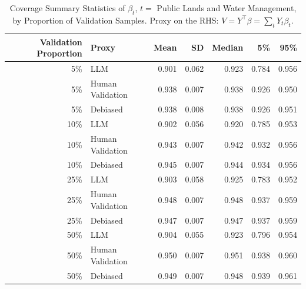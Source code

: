 \begin{table}

\caption{Coverage Summary Statistics of $\beta_{t}$, $t=$ Public Lands and Water Management, by Proportion of Validation Samples.
      Proxy on the RHS: $V = Y^\top \beta = \sum_{t} Y_t \beta_t$.}
\centering
\begin{tabular}[t]{rlrrrrr}
\toprule
Validation Proportion & Proxy & Mean & SD & Median & 5\% & 95\%\\
\midrule
5\% & LLM & 0.901 & 0.062 & 0.923 & 0.784 & 0.956\\
5\% & Human Validation & 0.938 & 0.007 & 0.938 & 0.926 & 0.950\\
5\% & Debiased & 0.938 & 0.008 & 0.938 & 0.926 & 0.951\\
10\% & LLM & 0.902 & 0.056 & 0.920 & 0.785 & 0.953\\
10\% & Human Validation & 0.943 & 0.007 & 0.942 & 0.932 & 0.956\\
10\% & Debiased & 0.945 & 0.007 & 0.944 & 0.934 & 0.956\\
25\% & LLM & 0.903 & 0.058 & 0.925 & 0.783 & 0.952\\
25\% & Human Validation & 0.948 & 0.007 & 0.948 & 0.937 & 0.959\\
25\% & Debiased & 0.947 & 0.007 & 0.947 & 0.937 & 0.959\\
50\% & LLM & 0.904 & 0.055 & 0.923 & 0.796 & 0.954\\
50\% & Human Validation & 0.950 & 0.007 & 0.951 & 0.938 & 0.960\\
50\% & Debiased & 0.949 & 0.007 & 0.948 & 0.939 & 0.961\\
\bottomrule
\end{tabular}
\end{table}
